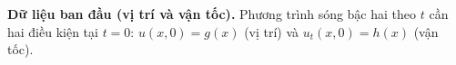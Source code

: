 \textbf{Dữ liệu ban đầu (vị trí và vận tốc).}
Phương trình sóng bậc hai theo $t$ cần hai điều kiện tại $t=0$: $u(x,0)=g(x)$ (vị trí) và $u_t(x,0)=h(x)$ (vận tốc).
